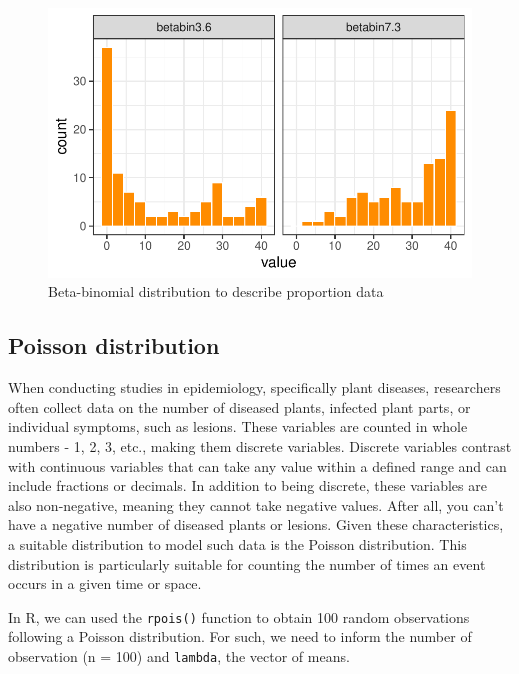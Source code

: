 \documentclass[
  letterpaper,
  DIV=11,
  numbers=noendperiod]{scrreprt}
\begin{document}
\begin{figure}[H]

{\centering \includegraphics{data-terminology_files/figure-pdf/fig-beta-1.pdf}

}

\caption{\label{fig-beta}Beta-binomial distribution to describe
proportion data}

\end{figure}

\hypertarget{poisson-distribution}{%
\subsection{Poisson distribution}\label{poisson-distribution}}

When conducting studies in epidemiology, specifically plant diseases,
researchers often collect data on the number of diseased plants,
infected plant parts, or individual symptoms, such as lesions. These
variables are counted in whole numbers - 1, 2, 3, etc., making them
discrete variables. Discrete variables contrast with continuous
variables that can take any value within a defined range and can include
fractions or decimals. In addition to being discrete, these variables
are also non-negative, meaning they cannot take negative values. After
all, you can't have a negative number of diseased plants or lesions.
Given these characteristics, a suitable distribution to model such data
is the Poisson distribution. This distribution is particularly suitable
for counting the number of times an event occurs in a given time or
space.

In R, we can used the \texttt{rpois()} function to obtain 100 random
observations following a Poisson distribution. For such, we need to
inform the number of observation (n = 100) and \texttt{lambda}, the
vector of means.
\end{document}
